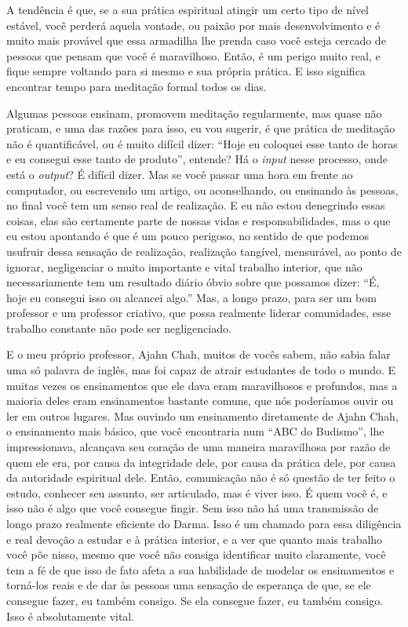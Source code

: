 A tendência é que, se a sua prática espiritual atingir um certo tipo
de nível estável, você perderá aquela vontade, ou paixão por mais
desenvolvimento e é muito mais provável que essa armadilha lhe prenda
caso você esteja cercado de pessoas que pensam que você é maravilhoso.
Então, é um perigo muito real, e fique sempre voltando para si mesmo e
sua própria prática. E isso significa encontrar tempo para meditação
formal todos os dias. 

Algumas pessoas ensinam, promovem meditação regularmente, mas quase
não praticam, e uma das razões para isso, eu vou sugerir, é que prática
de meditação não é quantificável, ou é muito difícil dizer: “Hoje eu
coloquei esse tanto de horas e eu consegui esse tanto de produto”,
entende? Há o \textit{input }nesse processo, onde está o
\textit{output}? É difícil dizer. Mas se você passar uma hora em frente
ao computador, ou escrevendo um artigo, ou aconselhando, ou ensinando
às pessoas, no final você tem um senso real de realização. E eu não
estou denegrindo essas coisas, elas são certamente parte de nossas
vidas e responsabilidades, mas o que eu estou apontando é que é um
pouco perigoso, no sentido de que podemos usufruir dessa sensação de
realização, realização tangível, mensurável, ao ponto de ignorar,
negligenciar o muito importante e vital trabalho interior, que não
necessariamente tem um resultado diário óbvio sobre que possamos dizer:
“É, hoje eu consegui isso ou alcancei algo.” Mas, a longo prazo, para
ser um bom professor e um professor criativo, que possa realmente
liderar comunidades, esse trabalho constante não pode ser
negligenciado. 

E o meu próprio professor, Ajahn Chah, muitos de vocês sabem, não
sabia falar uma só palavra de inglês, mas foi capaz de atrair
estudantes de todo o mundo. E muitas vezes os ensinamentos que ele dava
eram maravilhosos e profundos, mas a maioria deles eram ensinamentos
bastante comuns, que nós poderíamos ouvir ou ler em outros lugares. Mas
ouvindo um ensinamento diretamente de Ajahn Chah, o ensinamento mais
básico, que você encontraria num “ABC do Budismo”, lhe impressionava,
alcançava seu coração de uma maneira maravilhosa por razão de quem ele
era, por causa da integridade dele, por causa da prática dele, por
causa da autoridade espiritual dele. Então, comunicação não é só
questão de ter feito o estudo, conhecer seu assunto, ser articulado,
mas é viver isso. É quem você é, e isso não é algo que você consegue
fingir. Sem isso não há uma transmissão de longo prazo realmente
eficiente do Darma. Isso é um chamado para essa diligência e real
devoção a estudar e à prática interior, e a ver que quanto mais
trabalho você põe nisso, mesmo que você não consiga identificar muito
claramente, você tem a fé de que isso de fato afeta a sua habilidade de
modelar os ensinamentos e torná-los reais e de dar às pessoas uma
sensação de esperança de que, se ele consegue fazer, eu também consigo.
Se ela consegue fazer, eu também consigo. Isso é absolutamente vital. 

